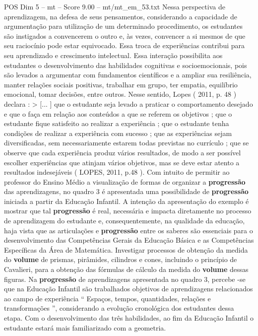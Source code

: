 \begin{textsample}{POS Dim 5 – mt – Score 9.00 – mt/mt\_em\_53.txt}
Nessa perspectiva de aprendizagem, na defesa de seus pensamentos, considerando a capacidade de argumentação para utilização de um determinado procedimento, os estudantes são instigados a convencerem o outro e, às vezes, convencer a si mesmos de que seu raciocínio pode estar equivocado.
Essa troca de experiências contribui para seu aprendizado e crescimento intelectual.
Essa interação possibilita aos estudantes o desenvolvimento das habilidades cognitivas e socioemocionais, pois são levados a argumentar com fundamentos científicos e a ampliar sua resiliência, manter relações sociais positivas, trabalhar em grupo, ter empatia, equilíbrio emocional, tomar decisões, entre outros.
Nesse sentido, Lopes ( 2011, p. 48 ) declara : > [... ] que o estudante seja levado a praticar o comportamento desejado e que o faça em relação aos conteúdos a que se referem os objetivos ; que o estudante fique satisfeito ao realizar a experiência ; que o estudante tenha condições de realizar a experiência com sucesso ; que as experiências sejam diversificadas, sem necessariamente estarem todas previstas no currículo ; que se observe que cada experiência produz vários resultados, de modo a ser possível escolher experiências que atinjam vários objetivos, mas se deve estar atento a resultados indesejáveis ( LOPES, 2011, p.48 ).
Com intuito de permitir ao professor do Ensino Médio a visualização de formas de organizar a \textbf{progressão} das aprendizagens, no quadro 3 é apresentada uma possibilidade de \textbf{progressão} iniciada a partir da Educação Infantil.
A intenção da apresentação do exemplo é mostrar que tal \textbf{progressão} é real, necessária e impacta diretamente no processo de aprendizagem do estudante e, consequentemente, na qualidade da educação, haja vista que as articulações e \textbf{progressão} entre os saberes são essenciais para o desenvolvimento das Competências Gerais da Educação Básica e as Competências Específicas da Área de Matemática.
Investigar processos de obtenção da medida do \textbf{volume} de prismas, pirâmides, cilindros e cones, incluindo o princípio de Cavalieri, para a obtenção das fórmulas de cálculo da medida do \textbf{volume} dessas figuras.
Na \textbf{progressão} de aprendizagens apresentada no quadro 3, percebe -se que na Educação Infantil são trabalhados objetivos de aprendizagens relacionados ao campo de experiência “ Espaços, tempos, quantidades, relações e transformações ”, considerando a evolução cronológica dos estudantes dessa etapa.
Com o desenvolvimento das três habilidades, ao fim da Educação Infantil o estudante estará mais familiarizado com a geometria.

\end{textsample}
